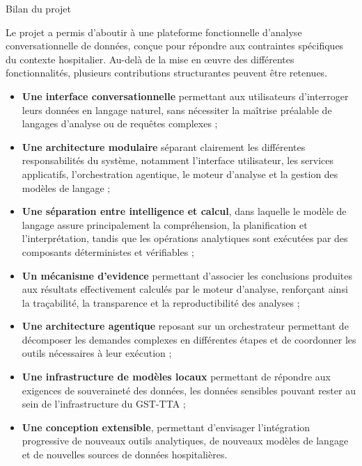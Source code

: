 \begin{resultbox}{Bilan du projet}

Le projet a permis d'aboutir à une plateforme fonctionnelle d'analyse conversationnelle de données, conçue pour répondre aux contraintes spécifiques du contexte hospitalier. Au-delà de la mise en œuvre des différentes fonctionnalités, plusieurs contributions structurantes peuvent être retenues.

\begin{itemize}
    \item \textbf{Une interface conversationnelle} permettant aux utilisateurs d'interroger leurs données en langage naturel, sans nécessiter la maîtrise préalable de langages d'analyse ou de requêtes complexes ;

    \item \textbf{Une architecture modulaire} séparant clairement les différentes responsabilités du système, notamment l'interface utilisateur, les services applicatifs, l'orchestration agentique, le moteur d'analyse et la gestion des modèles de langage ;

    \item \textbf{Une séparation entre intelligence et calcul}, dans laquelle le modèle de langage assure principalement la compréhension, la planification et l'interprétation, tandis que les opérations analytiques sont exécutées par des composants déterministes et vérifiables ;

    \item \textbf{Un mécanisme d'evidence} permettant d'associer les conclusions produites aux résultats effectivement calculés par le moteur d'analyse, renforçant ainsi la traçabilité, la transparence et la reproductibilité des analyses ;

    \item \textbf{Une architecture agentique} reposant sur un orchestrateur permettant de décomposer les demandes complexes en différentes étapes et de coordonner les outils nécessaires à leur exécution ;

    \item \textbf{Une infrastructure de modèles locaux} permettant de répondre aux exigences de souveraineté des données, les données sensibles pouvant rester au sein de l'infrastructure du GST-TTA ;

    \item \textbf{Une conception extensible}, permettant d'envisager l'intégration progressive de nouveaux outils analytiques, de nouveaux modèles de langage et de nouvelles sources de données hospitalières.
\end{itemize}


\end{resultbox}
